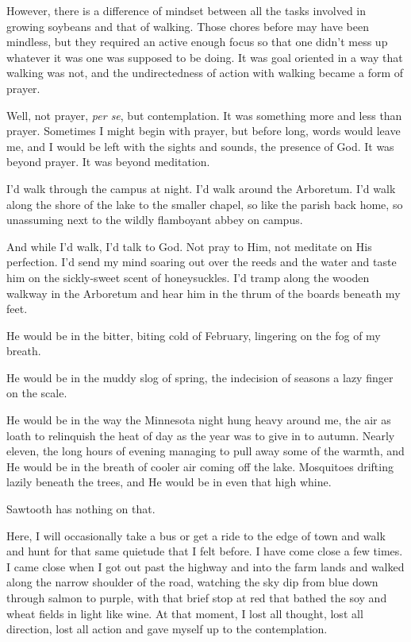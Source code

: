 However, there is a difference of mindset between all the tasks involved in growing soybeans and that of walking. Those chores before may have been mindless, but they required an active enough focus so that one didn't mess up whatever it was one was supposed to be doing. It was goal oriented in a way that walking was not, and the undirectedness of action with walking became a form of prayer.

Well, not prayer, \emph{per se}, but contemplation. It was something more and less than prayer. Sometimes I might begin with prayer, but before long, words would leave me, and I would be left with the sights and sounds, the presence of God. It was beyond prayer. It was beyond meditation.

I'd walk through the campus at night. I'd walk around the Arboretum. I'd walk along the shore of the lake to the smaller chapel, so like the parish back home, so unassuming next to the wildly flamboyant abbey on campus.

And while I'd walk, I'd talk to God. Not pray to Him, not meditate on His perfection. I'd send my mind soaring out over the reeds and the water and taste him on the sickly-sweet scent of honeysuckles. I'd tramp along the wooden walkway in the Arboretum and hear him in the thrum of the boards beneath my feet.

He would be in the bitter, biting cold of February, lingering on the fog of my breath.

He would be in the muddy slog of spring, the indecision of seasons a lazy finger on the scale.

He would be in the way the Minnesota night hung heavy around me, the air as loath to relinquish the heat of day as the year was to give in to autumn. Nearly eleven, the long hours of evening managing to pull away some of the warmth, and He would be in the breath of cooler air coming off the lake. Mosquitoes drifting lazily beneath the trees, and He would be in even that high whine.

Sawtooth has nothing on that.

Here, I will occasionally take a bus or get a ride to the edge of town and walk and hunt for that same quietude that I felt before. I have come close a few times. I came close when I got out past the highway and into the farm lands and walked along the narrow shoulder of the road, watching the sky dip from blue down through salmon to purple, with that brief stop at red that bathed the soy and wheat fields in light like wine. At that moment, I lost all thought, lost all direction, lost all action and gave myself up to the contemplation.

